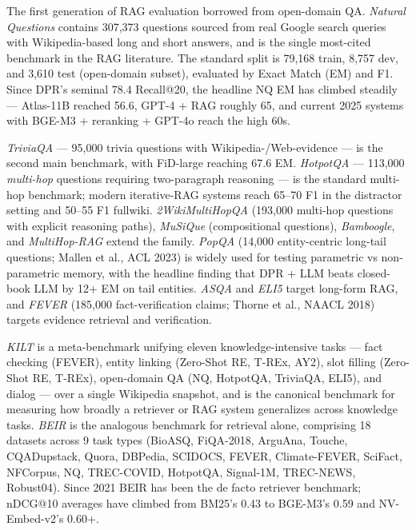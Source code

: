 \documentclass{article}
\begin{document}
The first generation of RAG evaluation borrowed from open-domain QA. \emph{Natural Questions} \citep{kwiatkowski20192019} contains 307,373 questions sourced from real Google search queries with Wikipedia-based long and short answers, and is the single most-cited benchmark in the RAG literature. The standard split is 79,168 train, 8,757 dev, and 3,610 test (open-domain subset), evaluated by Exact Match (EM) and F1. Since DPR's seminal 78.4 Recall@20, the headline NQ EM has climbed steadily --- Atlas-11B reached 56.6, GPT-4 + RAG roughly 65, and current 2025 systems with BGE-M3 + reranking + GPT-4o reach the high 60s.

\emph{TriviaQA} \citep{joshi2017triviaqaalargescal} --- 95,000 trivia questions with Wikipedia-/Web-evidence --- is the second main benchmark, with FiD-large reaching 67.6 EM. \emph{HotpotQA} \citep{yang2018hotpotqaadatasetfo} --- 113,000 \emph{multi-hop} questions requiring two-paragraph reasoning --- is the standard multi-hop benchmark; modern iterative-RAG systems reach 65--70 F1 in the distractor setting and 50--55 F1 fullwiki. \emph{2WikiMultiHopQA} (193,000 multi-hop questions with explicit reasoning paths), \emph{MuSiQue} (compositional questions), \emph{Bamboogle}, and \emph{MultiHop-RAG} extend the family. \emph{PopQA} (14,000 entity-centric long-tail questions; Mallen et al., ACL 2023) is widely used for testing parametric vs non-parametric memory, with the headline finding that DPR + LLM beats closed-book LLM by 12+ EM on tail entities. \emph{ASQA} and \emph{ELI5} target long-form RAG, and \emph{FEVER} (185,000 fact-verification claims; Thorne et al., NAACL 2018) targets evidence retrieval and verification.

\emph{KILT} \citep{petroni2021kiltabenchmarkfork} is a meta-benchmark unifying eleven knowledge-intensive tasks --- fact checking (FEVER), entity linking (Zero-Shot RE, T-REx, AY2), slot filling (Zero-Shot RE, T-REx), open-domain QA (NQ, HotpotQA, TriviaQA, ELI5), and dialog --- over a single Wikipedia snapshot, and is the canonical benchmark for measuring how broadly a retriever or RAG system generalizes across knowledge tasks. \emph{BEIR} \citep{thakur2021beiraheterogeneous} is the analogous benchmark for retrieval alone, comprising 18 datasets across 9 task types (BioASQ, FiQA-2018, ArguAna, Touche, CQADupstack, Quora, DBPedia, SCIDOCS, FEVER, Climate-FEVER, SciFact, NFCorpus, NQ, TREC-COVID, HotpotQA, Signal-1M, TREC-NEWS, Robust04). Since 2021 BEIR has been the de facto retriever benchmark; nDCG@10 averages have climbed from BM25's 0.43 to BGE-M3's 0.59 and NV-Embed-v2's 0.60+.
\end{document}
